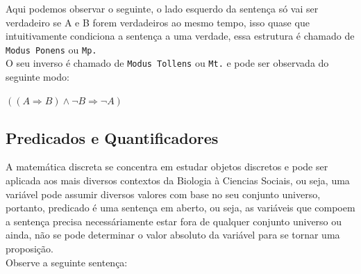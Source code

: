 \documentclass[12pt, onecolumn]{article}
\begin{document}
	Aqui podemos observar o seguinte, o lado esquerdo da sentença só 
	vai ser verdadeiro se A e B forem verdadeiros ao mesmo tempo, isso
	quase que intuitivamente condiciona a sentença a uma verdade, essa
	estrutura é chamado de \texttt{Modus Ponens} ou \texttt{Mp.} \\
	\newline
	O seu inverso é chamado de \texttt{Modus Tollens} ou \texttt{Mt.}
	e pode ser observada do seguinte modo: 
	\begin{center}
		$((A \Rightarrow B) \land \lnot{B} \Rightarrow \lnot{A})$
	\end{center}
		\subsection{\centering Predicados e Quantificadores}
	
	A matemática discreta se concentra em estudar objetos discretos e pode
	ser aplicada aos mais diversos contextos da Biologia à Ciencias Sociais, ou
	seja, uma variável pode assumir diversos valores com base no seu conjunto
	universo, portanto, predicado é uma sentença em aberto, ou seja, 
	as variáveis que compoem a sentença precisa necessáriamente estar fora de 
	qualquer conjunto universo ou ainda, não se pode determinar o valor absoluto 
	da variável para se tornar uma proposição. \\

	Observe a seguinte sentença: \\ 
\end{document}

